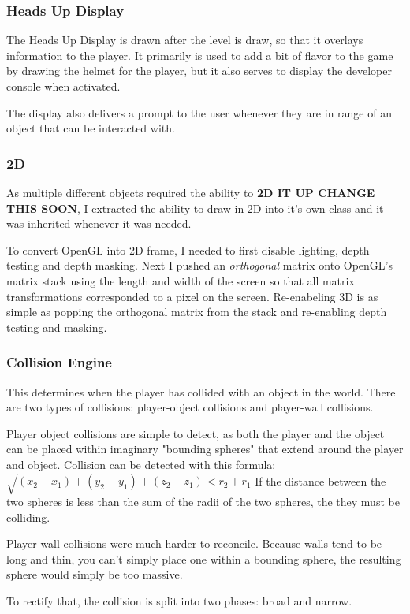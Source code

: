 \documentclass{article}
\begin{document}
\subsubsection{Heads Up Display}
The Heads Up Display is drawn after the level is draw, so that it overlays information to the player. It primarily is used to add a bit of flavor to the game by drawing the helmet for the player, but it also serves to display the developer console when activated.

The display also delivers a prompt to the user whenever they are in range of an object that can be interacted with.

\subsubsection{2D}
As multiple different objects required the ability to \textbf{2D IT UP CHANGE THIS SOON}, I extracted the ability to draw in 2D into it's own class and it was inherited whenever it was needed.

To convert OpenGL into 2D frame, I needed to first disable lighting, depth testing and depth masking. Next I pushed an \emph{orthogonal} matrix onto OpenGL's matrix stack using the length and width of the screen so that all matrix transformations corresponded to a pixel on the screen. Re-enabeling 3D is as simple as popping the orthogonal matrix from the stack and re-enabling depth testing and masking.

\subsubsection{Collision Engine}
This determines when the player has collided with an object in the world. There are two types of collisions: player-object collisions and player-wall collisions.

Player object collisions are simple to detect, as both the player and the object can be placed within imaginary "bounding spheres" that extend around the player and object. Collision can be detected with this formula:
$\sqrt{(x_2 - x_1) + (y_2 - y_1) + (z_2 - z_1)} < r_2 + r_1$
If the distance between the two spheres is less than the sum of the radii of the two spheres, the they must be colliding.

Player-wall collisions were much harder to reconcile. Because walls tend to be long and thin, you can't simply place one within a bounding sphere, the resulting sphere would simply be too massive.

To rectify that, the collision is split into two phases: broad and narrow.
\end{document}
